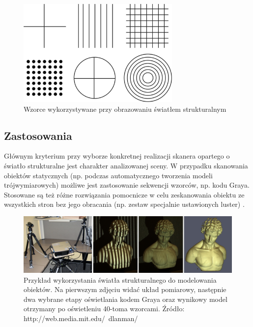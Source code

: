 \begin{figure}[h!]
\centering
\includegraphics[width=8cm]{../../Common/img/struct_patterns} 
\caption[Wzorce wykorzystywane przy obrazowaniu światłem strukturalnym]
{Wzorce wykorzystywane przy obrazowaniu światłem strukturalnym}
\label{fig:struct_patterns}
\end{figure}

\subsection{Zastosowania}

Głównym kryterium przy wyborze konkretnej realizacji skanera opartego o światło
strukturalne jest charakter analizowanej sceny. W przypadku skanowania obiektów
statycznych (np. podczas automatycznego tworzenia modeli trójwymiarowych)
możliwe jest zastosowanie sekwencji wzorców, np. kodu Graya. Stosowane są też
różne rozwiązania pomocnicze w celu zeskanowania obiektu ze wszystkich stron bez
jego obracania (np. zestaw specjalnie ustawionych luster) \cite{LanmanCT07}.

\begin{figure}[!ht]
\centering
\includegraphics[width=14cm]{../../Common/img/struct_all} 
\caption[Przykład wykorzystania światła strukturalnego do modelowania obiektów]
{Przykład wykorzystania światła strukturalnego do modelowania obiektów. Na
pierwszym zdjęciu widać układ pomiarowy, następnie dwa wybrane etapy oświetlania
kodem Graya oraz wynikowy model otrzymany po oświetleniu 40-toma wzorcami.
Źródło: http://web.media.mit.edu/~dlanman/}
\label{fig:struct_all}
\end{figure}


